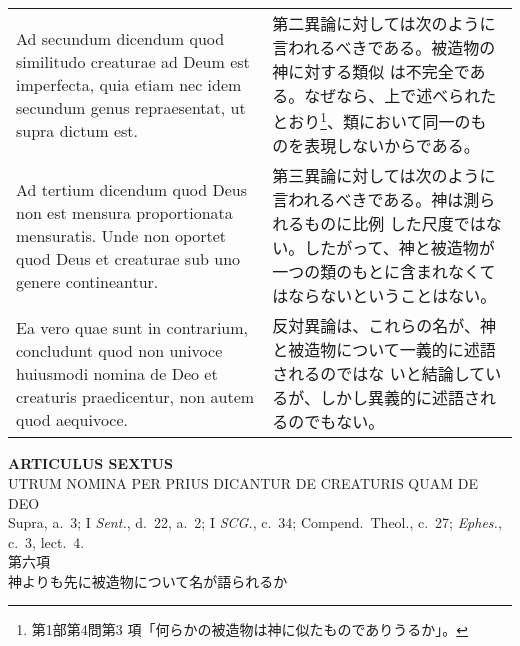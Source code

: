 \documentclass[10pt]{jsarticle}
\begin{document}
\begin{longtable}{p{21em}p{21em}}
\\

{\sc Ad secundum dicendum} quod similitudo creaturae ad Deum est
imperfecta, quia etiam nec idem secundum genus repraesentat, ut supra
dictum est.

&

第二異論に対しては次のように言われるべきである。被造物の神に対する類似
は不完全である。なぜなら、上で述べられたとおり\footnote{第1部第4問第3
項「何らかの被造物は神に似たものでありうるか」。}、類において同一のも
のを表現しないからである。

\\

{\sc Ad tertium dicendum} quod Deus non est mensura proportionata
mensuratis. Unde non oportet quod Deus et creaturae sub uno genere
contineantur.

&

第三異論に対しては次のように言われるべきである。神は測られるものに比例
した尺度ではない。したがって、神と被造物が一つの類のもとに含まれなくて
はならないということはない。

\\

Ea vero quae sunt in contrarium, concludunt quod non univoce huiusmodi
nomina de Deo et creaturis praedicentur, non autem quod aequivoce.

&

反対異論は、これらの名が、神と被造物について一義的に述語されるのではな
いと結論しているが、しかし異義的に述語されるのでもない。

\end{longtable}

\newpage
{}

\begin{center}
{\Large {\bf ARTICULUS SEXTUS}}\\
{\large UTRUM NOMINA PER PRIUS DICANTUR DE CREATURIS QUAM DE DEO}\\
{\footnotesize Supra, a.~3; I {\itshape Sent.}, d.~22, a.~2; I
{\itshape SCG.}, c.~34; Compend.~Theol.}, c.~27; {\itshape Ephes.},
c.~3, lect.~4.\\
{\Large 第六項\\神よりも先に被造物について名が語られるか}
\end{center}
\end{document}
